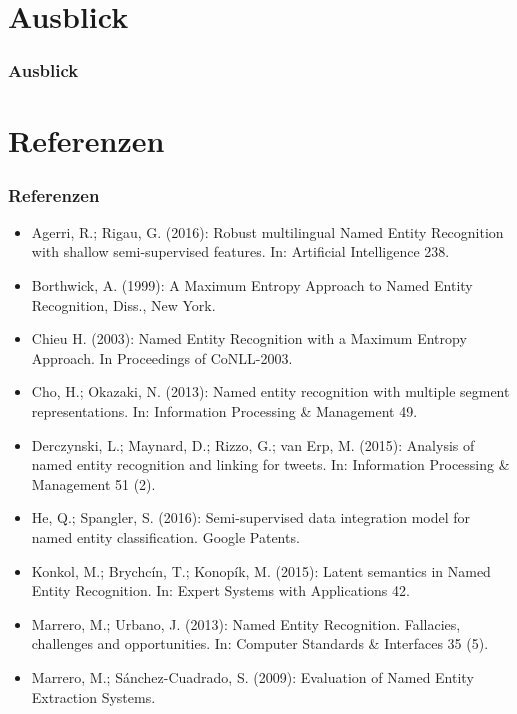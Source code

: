 \documentclass{beamer}
\begin{document}
\section{Ausblick}
	\begin{frame}
		\frametitle{Ausblick}
		
	\end{frame}
\section{Referenzen}
	\begin{frame}
		\frametitle{Referenzen}
		\begin{itemize}
			\item Agerri, R.; Rigau, G. (2016): Robust multilingual Named Entity Recognition with shallow semi-supervised features. In: Artificial Intelligence 238.\\
			\item Borthwick, A. (1999): A
				Maximum Entropy Approach to Named Entity Recognition, Diss., New York.\\
			\item Chieu H. (2003): Named Entity Recognition with a Maximum Entropy Approach. In Proceedings of CoNLL-2003.
			\item Cho, H.; Okazaki, N. (2013): Named entity recognition with multiple segment representations. In: Information Processing \& Management 49.\\
			\item Derczynski, L.; Maynard, D.; Rizzo, G.; van Erp, M. (2015): Analysis of named entity recognition and linking for tweets. In: Information Processing \& Management 51 (2).\\
		\end{itemize}
	\end{frame}
	\begin{frame}
		\begin{itemize}
			\item He, Q.; Spangler, S. (2016): Semi-supervised data integration model for named entity classification. Google Patents.
			\item Konkol, M.; Brychcín, T.; Konopík, M. (2015): Latent semantics in Named Entity Recognition. In: Expert Systems with Applications 42.\\
						
			\item Marrero, M.; Urbano, J. (2013): Named Entity Recognition. Fallacies, challenges and opportunities. In: Computer Standards \& Interfaces 35 (5).\\
			\item Marrero, M.; Sánchez-Cuadrado, S. (2009): Evaluation of Named Entity Extraction Systems.\\
		\end{itemize}
	\end{frame}
\end{document}
